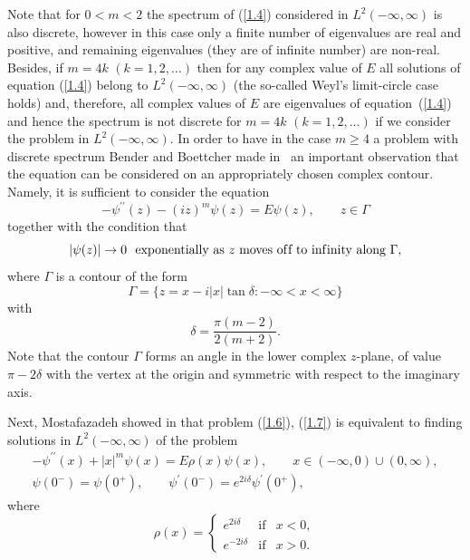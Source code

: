 \documentclass[pdftex]{sigma}
\numberwithin{equation}{section}
\begin{document}
Note that for $0<m<2$ the spectrum of (\ref{1.4}) considered in $%
L^{2}(-\infty ,\infty )$ is also discrete, however in this case only a
f\/inite number of eigenvalues are real and positive, and remaining
eigenvalues (they are of inf\/inite number) are non-real. Besides, if $m=4k$ $%
(k=1,2,\ldots )$ then for any complex value of $E$ all solutions of equation
(\ref{1.4}) belong to $L^{2}(-\infty ,\infty )$ (the so-called Weyl's
limit-circle case holds) and, therefore, all complex values of $E$ are
eigenvalues of equation~(\ref{1.4}) and hence the spectrum is not discrete
for $m=4k$ $(k=1,2,\ldots )$ if we consider the problem in $L^{2}(-\infty
,\infty ).$ In order to have in the case $m\geq 4$ a problem with discrete
spectrum Bender and Boettcher made in~\cite{[2]} an important observation
that the equation can be considered on an appropriately chosen complex
contour. Namely, it is suf\/f\/icient to consider the equation%
\begin{equation}
-\psi ^{\prime \prime }(z)-(iz)^{m}\psi (z)=E\psi (z),\qquad z\in \Gamma
\label{1.6}
\end{equation}%
together with the condition that%
\begin{equation}
\left\vert \psi (z)\right\vert \rightarrow 0 \ \text{ exponentially as }z\text{
moves of\/f to inf\/inity along }\Gamma ,  \label{1.7}
\end{equation}%
where $\Gamma $ is a contour of the form%
\[
\Gamma =\{z=x-i\left\vert x\right\vert \tan \delta :-\infty <x<\infty \}
\]%
with%
\[
\delta =\frac{\pi (m-2)}{2(m+2)}.
\]%
Note that the contour $\Gamma $ forms an angle in the lower complex $z$-plane, of value $\pi -2\delta $ with the vertex at the origin and symmetric
with respect to the imaginary axis.

Next, Mostafazadeh showed in \cite{[5]} that problem (\ref{1.6}), (\ref{1.7}) is equivalent to f\/inding solutions in $L^{2}(-\infty ,\infty )$ of the
problem%
\begin{gather}
-\psi ^{\prime \prime }(x)+\left\vert x\right\vert ^{m}\psi (x)=E\rho
(x)\psi (x),\qquad x\in (-\infty ,0)\cup (0,\infty ),  \label{1.8}
\\
\psi (0^{-})=\psi (0^{+}),\qquad \psi ^{\prime }(0^{-})=e^{2i\delta
}\psi ^{\prime }(0^{+}),  \label{1.9}
\end{gather}%
where%
\begin{equation}
\rho (x)=\left\{
\begin{array}{lll}
e^{2i\delta } & \text{if} & x<0, \\
e^{-2i\delta } & \text{if} & x>0.%
\end{array}%
\right.  \label{1.10}
\end{equation}
\end{document}
